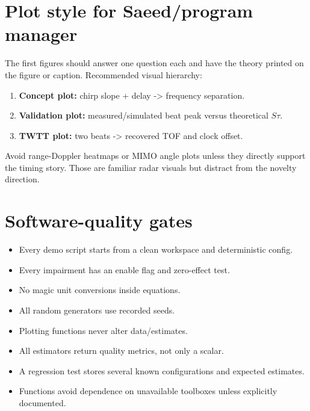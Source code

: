 \documentclass[11pt]{article}
\begin{document}
\section{Plot style for Saeed/program manager}
The first figures should answer one question each and have the theory printed on the figure or caption. Recommended visual hierarchy:
\begin{enumerate}
\item \textbf{Concept plot:} chirp slope + delay -> frequency separation.
\item \textbf{Validation plot:} measured/simulated beat peak versus theoretical $S\tau$.
\item \textbf{TWTT plot:} two beats -> recovered TOF and clock offset.
\end{enumerate}
Avoid range-Doppler heatmaps or MIMO angle plots unless they directly support the timing story. Those are familiar radar visuals but distract from the novelty direction.

\section{Software-quality gates}
\begin{itemize}
\item Every demo script starts from a clean workspace and deterministic config.
\item Every impairment has an enable flag and zero-effect test.
\item No magic unit conversions inside equations.
\item All random generators use recorded seeds.
\item Plotting functions never alter data/estimates.
\item All estimators return quality metrics, not only a scalar.
\item A regression test stores several known configurations and expected estimates.
\item Functions avoid dependence on unavailable toolboxes unless explicitly documented.
\end{itemize}
\end{document}

